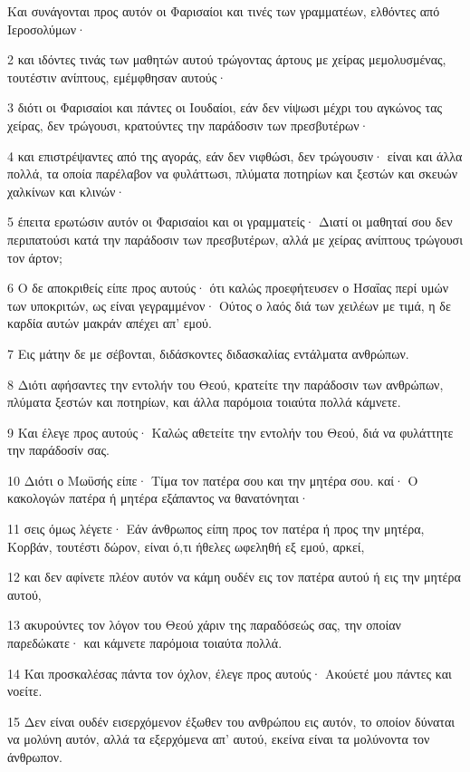 \par Και συνάγονται προς αυτόν οι Φαρισαίοι και τινές των γραμματέων, ελθόντες από Ιεροσολύμων·
\par 2 και ιδόντες τινάς των μαθητών αυτού τρώγοντας άρτους με χείρας μεμολυσμένας, τουτέστιν ανίπτους, εμέμφθησαν αυτούς·
\par 3 διότι οι Φαρισαίοι και πάντες οι Ιουδαίοι, εάν δεν νίψωσι μέχρι του αγκώνος τας χείρας, δεν τρώγουσι, κρατούντες την παράδοσιν των πρεσβυτέρων·
\par 4 και επιστρέψαντες από της αγοράς, εάν δεν νιφθώσι, δεν τρώγουσιν· είναι και άλλα πολλά, τα οποία παρέλαβον να φυλάττωσι, πλύματα ποτηρίων και ξεστών και σκευών χαλκίνων και κλινών·
\par 5 έπειτα ερωτώσιν αυτόν οι Φαρισαίοι και οι γραμματείς· Διατί οι μαθηταί σου δεν περιπατούσι κατά την παράδοσιν των πρεσβυτέρων, αλλά με χείρας ανίπτους τρώγουσι τον άρτον;
\par 6 Ο δε αποκριθείς είπε προς αυτούς· ότι καλώς προεφήτευσεν ο Ησαΐας περί υμών των υποκριτών, ως είναι γεγραμμένον· Ούτος ο λαός διά των χειλέων με τιμά, η δε καρδία αυτών μακράν απέχει απ' εμού.
\par 7 Εις μάτην δε με σέβονται, διδάσκοντες διδασκαλίας εντάλματα ανθρώπων.
\par 8 Διότι αφήσαντες την εντολήν του Θεού, κρατείτε την παράδοσιν των ανθρώπων, πλύματα ξεστών και ποτηρίων, και άλλα παρόμοια τοιαύτα πολλά κάμνετε.
\par 9 Και έλεγε προς αυτούς· Καλώς αθετείτε την εντολήν του Θεού, διά να φυλάττητε την παράδοσίν σας.
\par 10 Διότι ο Μωϋσής είπε· Τίμα τον πατέρα σου και την μητέρα σου. καί· Ο κακολογών πατέρα ή μητέρα εξάπαντος να θανατόνηται·
\par 11 σεις όμως λέγετε· Εάν άνθρωπος είπη προς τον πατέρα ή προς την μητέρα, Κορβάν, τουτέστι δώρον, είναι ό,τι ήθελες ωφεληθή εξ εμού, αρκεί,
\par 12 και δεν αφίνετε πλέον αυτόν να κάμη ουδέν εις τον πατέρα αυτού ή εις την μητέρα αυτού,
\par 13 ακυρούντες τον λόγον του Θεού χάριν της παραδόσεώς σας, την οποίαν παρεδώκατε· και κάμνετε παρόμοια τοιαύτα πολλά.
\par 14 Και προσκαλέσας πάντα τον όχλον, έλεγε προς αυτούς· Ακούετέ μου πάντες και νοείτε.
\par 15 Δεν είναι ουδέν εισερχόμενον έξωθεν του ανθρώπου εις αυτόν, το οποίον δύναται να μολύνη αυτόν, αλλά τα εξερχόμενα απ' αυτού, εκείνα είναι τα μολύνοντα τον άνθρωπον.

